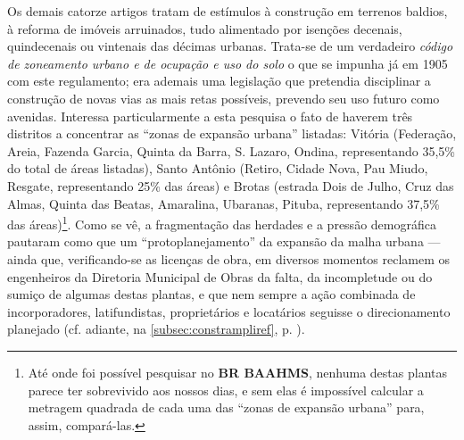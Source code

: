 Os demais catorze artigos tratam de estímulos à construção em terrenos baldios, à reforma de imóveis arruinados, tudo alimentado por isenções decenais, quindecenais ou vintenais das décimas urbanas. Trata-se de um verdadeiro \textit{código de zoneamento urbano e de ocupação e uso do solo} o que se impunha já em 1905 com este regulamento; era ademais uma legislação que pretendia disciplinar a construção de novas vias as mais retas possíveis, prevendo seu uso futuro como avenidas. Interessa particularmente a esta pesquisa o fato de haverem três distritos a concentrar as ``zonas de expansão urbana'' listadas: Vitória (Federação, Areia, Fazenda Garcia, Quinta da Barra, S. Lazaro, Ondina, representando 35,5\% do total de áreas listadas), Santo Antônio (Retiro, Cidade Nova, Pau Miudo, Resgate, representando 25\% das áreas) e Brotas (estrada Dois de Julho, Cruz das Almas, Quinta das Beatas, Amaralina, Ubaranas, Pituba, representando 37,5\% das áreas)\footnote{Até onde foi possível pesquisar no \textbf{BR BAAHMS}, nenhuma destas plantas parece ter sobrevivido aos nossos dias, e sem elas é impossível calcular a metragem quadrada de cada uma das ``zonas de expansão urbana'' para, assim, compará-las.}. Como se vê, a fragmentação das herdades e a pressão demográfica pautaram como que um ``protoplanejamento'' da expansão da malha urbana ---  ainda que, verificando-se as licenças de obra, em diversos momentos reclamem os engenheiros da Diretoria Municipal de Obras da falta, da incompletude ou do sumiço de algumas destas plantas, e que nem sempre a ação combinada de incorporadores, latifundistas, proprietários e locatários seguisse o direcionamento planejado (cf. adiante, na \autoref{subsec:constrampliref}, p. \pageref{subsec:constrampliref}). 

